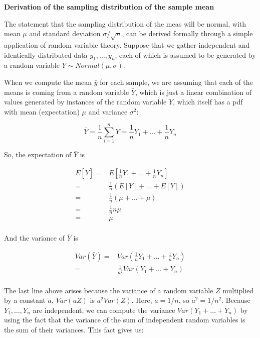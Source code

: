 \documentclass[
  12pt,
]{krantz}
\theoremstyle{definition}
\theoremstyle{definition}
\theoremstyle{definition}
\theoremstyle{definition}
\theoremstyle{remark}
\begin{document}
\begin{blackbox}

\textbf{Derivation of the sampling distribution of the sample mean}

The statement that the sampling distribution of the meas will be normal, with mean \(\mu\) and standard deviation \(\sigma/\sqrt{n}\), can be derived formally through a simple application of random variable theory. Suppose that we gather independent and identically distributed data \(y_1, \dots, y_n\), each of which is assumed to be generated by a random variable \(Y\sim Normal(\mu,\sigma)\).

When we compute the mean \(\bar{y}\) for each sample, we are assuming that each of the means is coming from a random variable \(\bar{Y}\), which is just a linear combination of values generated by instances of the random variable \(Y\), which itself has a pdf with mean (expectation) \(\mu\) and variance \(\sigma^2\):

\begin{equation}
\bar{Y}=\frac{1}{n} \sum_{i=1}^n Y = \frac{1}{n}Y_1 + \dots + \frac{1}{n}Y_n
 \end{equation}

So, the expectation of \(\bar{Y}\) is

\begin{equation}
\begin{split}
E[\bar{Y}] =& E[\frac{1}{n}Y_1 + \dots + \frac{1}{n}Y_n]\\
=& \frac{1}{n} (E[Y] + \dots + E[Y])\\
=& \frac{1}{n} (\mu + \dots + \mu)\\
=& \frac{1}{n} n\mu \\
=& \mu \\
\end{split}
\end{equation}

And the variance of \(\bar{Y}\) is

\begin{equation}
\begin{split}
Var(\bar{Y}) =& Var(\frac{1}{n}Y_1 + \dots + \frac{1}{n}
Y_n)\\
=& \frac{1}{n^2} Var(Y_1 + \dots + Y_n)\\
\end{split}
\end{equation}

The last line above arises because the variance of a random variable \(Z\) multiplied by a constant \(a\), \(Var(aZ)\) is \(a^2 Var(Z)\). Here, \(a=1/n\), so \(a^2 = 1/n^2\).
Because \(Y_1,\dots,Y_n\) are independent, we can compute the variance \(Var(Y_1 + \dots + Y_n)\) by using the fact that the variance of the sum of independent random variables is the sum of their variances. This fact gives us:


\end{blackbox}
\end{document}
